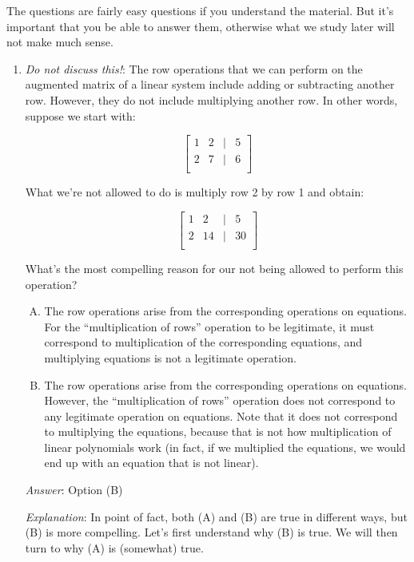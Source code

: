\documentclass[10pt]{amsart}
\begin{document}
The questions are fairly easy questions if you understand the
material. But it's important that you be able to answer them,
otherwise what we study later will not make much sense.

\begin{enumerate}
\item {\em Do not discuss this!}: The row operations that we can
  perform on the augmented matrix of a linear system include adding or
  subtracting another row. However, they do not include multiplying
  another row. In other words, suppose we start with:

  $$\left[\begin{matrix} 1 & 2 & | & 5\\ 2 & 7 & \mid & 6 \\\end{matrix}\right]$$

  What we're not allowed to do is multiply row 2 by row 1 and obtain:

  $$\left[\begin{matrix} 1 & 2 & | & 5\\ 2 & 14 & \mid & 30 \\\end{matrix}\right]$$

  What's the most compelling reason for our not being allowed to
  perform this operation?
  \begin{enumerate}[(A)]
  \item The row operations arise from the corresponding operations on
    equations. For the ``multiplication of rows'' operation to be
    legitimate, it must correspond to multiplication of the
    corresponding equations, and multiplying equations is not a
    legitimate operation.
  \item The row operations arise from the corresponding operations on
    equations. However, the ``multiplication of rows'' operation does
    not correspond to any legitimate operation on equations. Note that
    it does not correspond to multiplying the equations, because that
    is not how multiplication of linear polynomials work (in fact, if
    we multiplied the equations, we would end up with an equation that
    is not linear).
  \end{enumerate}

  {\em Answer}: Option (B)

  {\em Explanation}: In point of fact, both (A) and (B) are true in
  different ways, but (B) is more compelling. Let's first understand
  why (B) is true. We will then turn to why (A) is (somewhat) true.


\end{enumerate}
\end{document}
